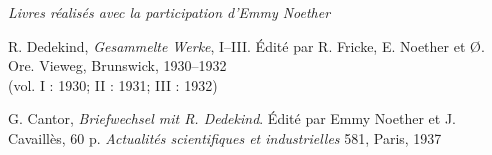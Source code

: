 \clearpage
\begin{center}
\emph{Livres réalisés avec la participation d'Emmy Noether}
\end{center}
\label{fr-r823-livres-participation-emmy-noether}

\begingroup
\setlength{\parindent}{0pt}
\setlength{\parskip}{0.5em}
R. Dedekind, \emph{Gesammelte Werke}, I--III. Édité par R. Fricke, E. Noether et Ø. Ore. Vieweg, Brunswick, 1930--1932\\
(vol. I : 1930; II : 1931; III : 1932)\par
G. Cantor, \emph{Briefwechsel mit R. Dedekind}. Édité par Emmy Noether et J. Cavaillès, 60 p. \emph{Actualités scientifiques et industrielles} 581, Paris, 1937\par
\endgroup
